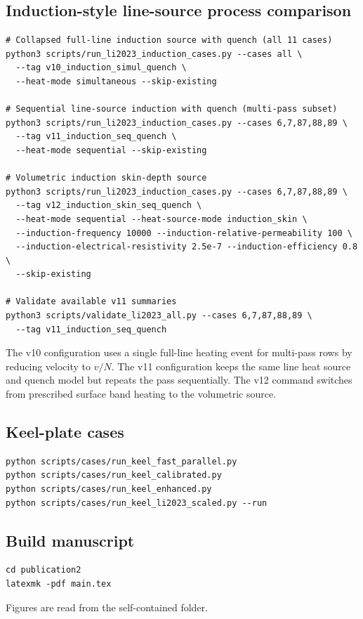 \subsection{Induction-style line-source process comparison}
\begin{verbatim}
# Collapsed full-line induction source with quench (all 11 cases)
python3 scripts/run_li2023_induction_cases.py --cases all \
  --tag v10_induction_simul_quench \
  --heat-mode simultaneous --skip-existing

# Sequential line-source induction with quench (multi-pass subset)
python3 scripts/run_li2023_induction_cases.py --cases 6,7,87,88,89 \
  --tag v11_induction_seq_quench \
  --heat-mode sequential --skip-existing

# Volumetric induction skin-depth source
python3 scripts/run_li2023_induction_cases.py --cases 6,7,87,88,89 \
  --tag v12_induction_skin_seq_quench \
  --heat-mode sequential --heat-source-mode induction_skin \
  --induction-frequency 10000 --induction-relative-permeability 100 \
  --induction-electrical-resistivity 2.5e-7 --induction-efficiency 0.8 \
  --skip-existing

# Validate available v11 summaries
python3 scripts/validate_li2023_all.py --cases 6,7,87,88,89 \
  --tag v11_induction_seq_quench
\end{verbatim}

The v10 configuration uses a single full-line heating event for multi-pass rows by reducing velocity to $v/N$. The v11 configuration keeps the same line heat source and quench model but repeats the pass sequentially. The v12 command switches from prescribed surface band heating to the  volumetric source.

\subsection{Keel-plate cases}
\begin{verbatim}
python scripts/cases/run_keel_fast_parallel.py
python scripts/cases/run_keel_calibrated.py
python scripts/cases/run_keel_enhanced.py
python scripts/cases/run_keel_li2023_scaled.py --run
\end{verbatim}

\subsection{Build manuscript}
\begin{verbatim}
cd publication2
latexmk -pdf main.tex
\end{verbatim}
Figures are read from the self-contained  folder.
